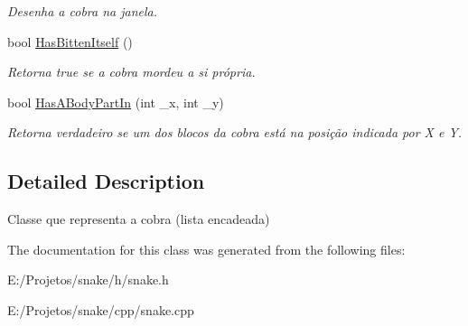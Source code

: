 \begin{DoxyCompactItemize}
\begin{DoxyCompactList}\small\item\em Desenha a cobra na janela. \end{DoxyCompactList}\item 
\hypertarget{class_snake_aaad03f31a17e8fe59b8e0cc5e386fab2}{}bool \hyperlink{class_snake_aaad03f31a17e8fe59b8e0cc5e386fab2}{Has\+Bitten\+Itself} ()\label{class_snake_aaad03f31a17e8fe59b8e0cc5e386fab2}

\begin{DoxyCompactList}\small\item\em Retorna true se a cobra mordeu a si própria. \end{DoxyCompactList}\item 
\hypertarget{class_snake_ab0783d3175a845ec1442f5d0a43bca3c}{}bool \hyperlink{class_snake_ab0783d3175a845ec1442f5d0a43bca3c}{Has\+A\+Body\+Part\+In} (int \+\_\+x, int \+\_\+y)\label{class_snake_ab0783d3175a845ec1442f5d0a43bca3c}

\begin{DoxyCompactList}\small\item\em Retorna verdadeiro se um dos blocos da cobra está na posição indicada por X e Y. \end{DoxyCompactList}\end{DoxyCompactItemize}


\subsection{Detailed Description}
Classe que representa a cobra (lista encadeada) 

The documentation for this class was generated from the following files\+:\begin{DoxyCompactItemize}
\item 
E\+:/\+Projetos/snake/h/snake.\+h\item 
E\+:/\+Projetos/snake/cpp/snake.\+cpp\end{DoxyCompactItemize}
